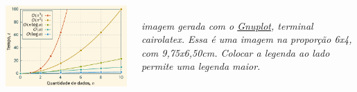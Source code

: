 \documentclass[aspectratio=169]{beamer}
\begin{document}
\begin{frame}[t]\frametitle{\secname}\framesubtitle{\subsecname}
  \begin{columns}[T]
    \begin{column}{9.75cm}
      \includegraphics[width=\columnwidth]{images/pdf/complexidade.pdf}%
    \end{column}
    \begin{column}{4.25cm}
      \it{}\\
      imagem gerada com o \href{http://www.gnuplot.info/}{Gnuplot}, terminal cairolatex.
      Essa é uma imagem na proporção 6x4, com 9,75x6,50cm. Colocar a legenda ao lado permite uma legenda maior.
    \end{column}
  \end{columns}
\end{frame}
\end{document}
